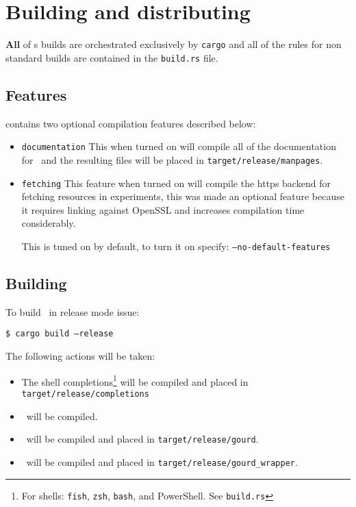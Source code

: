 \section{Building and distributing}

\textbf{All} of {\gourd}s builds are orchestrated exclusively by \texttt{cargo}
and all of the rules for non standard builds are contained in the \texttt{build.rs} file.


\subsection{Features}

\gourd contains two optional compilation features described below:

\begin{itemize}
  \item \texttt{documentation}
  This when turned on will compile all of the documentation for \gourd\ and
  the resulting files will be placed in \texttt{target/release/manpages}.

  \item \texttt{fetching}
  This feature when turned on will compile the https backend for fetching resources
  in experiments, this was made an optional feature because it requires linking against
  OpenSSL and increases compilation time considerably.

  This is tuned on by default, to turn it on specify: \texttt{--no-default-features}
\end{itemize}

\subsection{Building}

To build \gourd\ in release mode issue:

\texttt{\$ cargo build --release}
\vspace{0.5cm}

\noindent The following actions will be taken:

\begin{itemize}
  \item The shell completions\footnote{For shells: \texttt{fish}, \texttt{zsh}, \texttt{bash}, and PowerShell. See \texttt{build.rs}}
  will be compiled and placed in \texttt{target/release/completions}
  \item \gourdlib\ will be compiled.
  \item \gourd\ will be compiled and placed in \texttt{target/release/gourd}.
  \item \gourdwrap\ will be compiled and placed in \texttt{target/release/gourd\_wrapper}.
\end{itemize}

